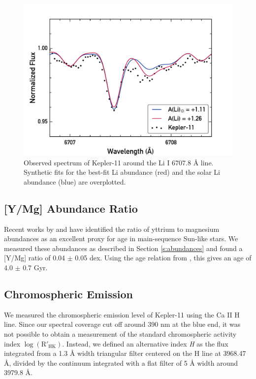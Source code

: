 \documentclass[oneside]{emulateapj}
\begin{document}
\begin{figure}
\centering
\includegraphics[width=\columnwidth]{lithium}
\caption{Observed spectrum of Kepler-11 around the Li I 6707.8 \r{A} line. Synthetic fits for the best-fit Li abundance (red) and the solar Li abundance (blue) are overplotted. }
\label{fig:lithium}
\end{figure}


\subsection{[Y/Mg] Abundance Ratio}

Recent works by \citet{Nissen2015} and \citet{TucciMaia2016} have identified the ratio of yttrium to magnesium abundances as an excellent proxy for age in main-sequence Sun-like stars. We measured these abundances as described in Section \ref{s:abundances} and found a [Y/Mg] ratio of 0.04 $\pm$ 0.05 dex. Using the age relation from \citet{TucciMaia2016}, this gives an age of 4.0 $\pm$ 0.7 Gyr. 

\subsection{Chromospheric Emission}

We measured the chromospheric emission level of Kepler-11 using the Ca II H line. Since our spectral coverage cut off around 390 nm at the blue end, it was not possible to obtain a measurement of the standard chromospheric activity index $\log(\mathrm{R'_{HK}})$. Instead, we defined an alternative index \textit{H} as the flux integrated from a 1.3 \r{A} width triangular filter centered on the H line at 3968.47 \r{A}, divided by the continuum integrated with a flat filter of 5 \r{A} width around 3979.8 \r{A}.  
\end{document}
